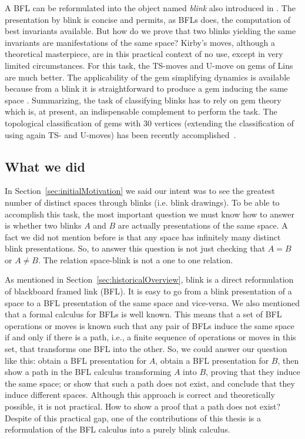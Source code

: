 A BFL can be reformulated into the object named {\it blink} also
introduced in \cite{kauffman1994tlr}. The presentation by blink
is concise and permits, as BFLs does, the computation of best invariants
available. But how do we prove that two blinks yielding the same
invariants are manifestations of the same space? Kirby's moves, although a
theoretical masterpiece, are in this practical context of no use,
except in very limited circumstances. For this task, the TS-moves
and U-move on gems of Lins \cite{lins1995gca} are much better. The
applicability of the gem simplifying dynamics is available because
from a blink it is straightforward to produce a gem inducing the
same space \cite{kauffman1994tlr}. Summarizing, the task of
classifying blinks has to rely on gem theory which is, at present,
an indispensable complement to perform the task. The topological
classification of gems with 30 vertices (extending the classification
of \cite{lins1995gca} using again TS- and U-moves) has been recently
accomplished~\cite{casalicristofori2006}.

\subsection{What we did}

In Section~\ref{sec:initialMotivation} we said our intent was to see
the greatest number of distinct spaces through blinks (i.e. blink drawings).
To be able to accomplish this task, the most important question we must know
how to answer is whether two blinks $A$ and $B$ are
actually presentations of the same space. A fact we did
not mention before is that any space has infinitely
many distinct blink presentations. So, to answer this question is
not just checking that $A = B$ or $A \neq B$. The relation
space-blink is not a one to one relation.

As mentioned in Section~\ref{sec:historicalOverview}, blink is a direct
reformulation of blackboard framed link (BFL). It is easy to go from a blink
presentation of a space to a BFL presentation of the same space and
vice-versa. We also mentioned that a formal calculus for BFLs is well
known. This
means that a set of BFL operations or moves is known such that any pair
of BFLs induce the same space if and only if there
is a path, i.e., a finite sequence of operations or moves in this set, that
transforms one BFL into the other. So, we could answer our question like
this: obtain a BFL presentation for $A$, obtain a BFL presentation for
$B$, then show a path in the BFL calculus transforming $A$ into $B$, proving
that they induce the same space; or show that such a path does not exist, and
conclude that they induce different spaces. Although this approach is correct and theoretically
possible, it is not practical. How to show a proof that a path does not
exist? Despite of this practical gap, one of the contributions of
this thesis is a reformulation of the BFL calculus into a purely blink
calculus.%

